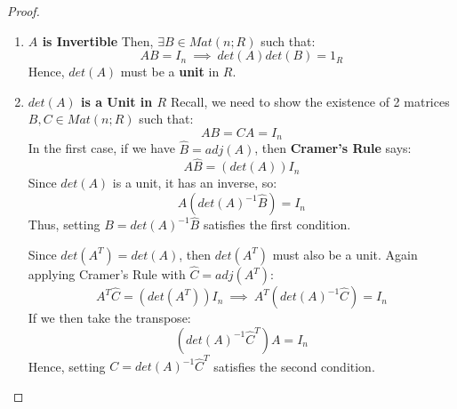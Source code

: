 \documentclass{exam}
\begin{document}

\begin{proof}

\begin{enumerate}
    \item \textbf{$A$ is Invertible}
    Then, $\exists B \in Mat(n;R)$ such that:
    \[
    AB = I_n \ \implies \ det(A)det(B) = 1_R
    \]
    Hence, $det(A)$ must be a \textbf{unit} in $R$.
    \item \textbf{$det(A)$ is a Unit in $R$}
    Recall, we need to show the existence of 2 matrices $B,C \in Mat(n;R)$ such that:
    \[
    AB = CA = I_n
    \]
    In the first case, if we have $\hat{B} = adj(A)$, then \textbf{Cramer's Rule} says:
    \[
    A\hat{B} = (det(A))I_n
    \]
    Since $det(A)$ is a unit, it has an inverse, so:
    \[
    A(det(A)^{-1}\hat{B}) = I_n
    \]
    Thus, setting $B = det(A)^{-1}\hat{B}$ satisfies the first condition.
    
    \bigskip
    
    Since $det(A^T) = det(A)$, then $det(A^T)$ must also be a unit. Again applying Cramer's Rule with $\hat{C} = adj(A^T)$:
    \[
    A^T\hat{C} = (det(A^T))I_n \ \implies \ A^T(det(A)^{-1}\hat{C}) = I_n
    \]
    If we then take the transpose:
    \[
    (det(A)^{-1}\hat{C}^T)A = I_n
    \]
    Hence, setting $C = det(A)^{-1}\hat{C}^T$ satisfies the second condition.
\end{enumerate}

\end{proof}
\end{document}
